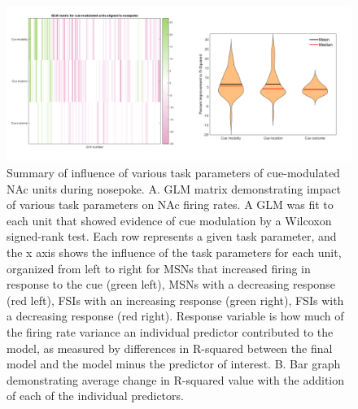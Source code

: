 \documentclass[11pt]{article}
\begin{document}
\begin{figure}[h]
\centering
\includegraphics[width=\textwidth]{Fig 9 - NP GLM.png}
\caption{Summary of influence of various task parameters of cue-modulated NAc units during nosepoke. A. GLM matrix demonstrating impact of various task parameters on NAc firing rates. A GLM was fit to each unit that showed evidence of cue modulation by a Wilcoxon signed-rank test. Each row represents a given task parameter, and the x axis shows the influence of the task parameters for each unit, organized from left to right for MSNs that increased firing in response to the cue (green left), MSNs with a decreasing response (red left), FSIs with an increasing response (green right), FSIs with a decreasing response (red right). Response variable is how much of the firing rate variance an individual predictor contributed to the model, as measured by differences in R-squared between the final model and the model minus the predictor of interest. B. Bar graph demonstrating average change in R-squared value with the addition of each of the individual predictors.}
\label{fig:NP_GLM}
\end{figure}
\end{document}

